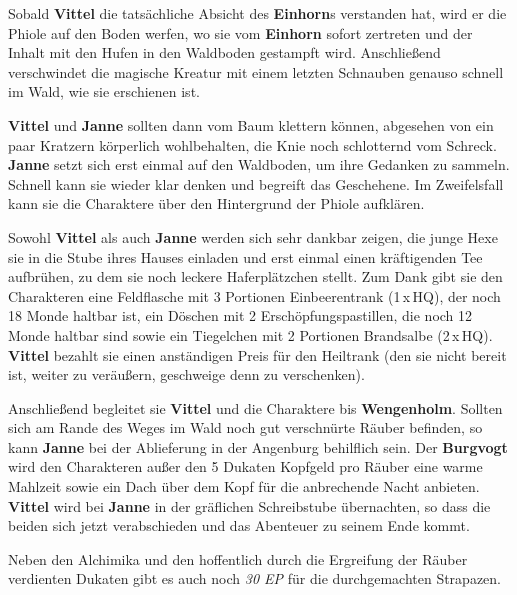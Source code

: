 Sobald \textbf{Vittel} die tatsächliche Absicht des \textbf{Einhorn}s verstanden hat, wird er die Phiole auf den Boden werfen, wo sie vom \textbf{Einhorn} sofort zertreten und der Inhalt mit den Hufen in den Waldboden gestampft wird.
Anschließend verschwindet die magische Kreatur mit einem letzten Schnauben genauso schnell im Wald, wie sie erschienen ist.


\textbf{Vittel} und \textbf{Janne} sollten dann vom Baum klettern können, abgesehen von ein paar Kratzern körperlich wohlbehalten, die Knie noch schlotternd vom Schreck.
\textbf{Janne} setzt sich erst einmal auf den Waldboden, um ihre Gedanken zu sammeln. Schnell kann sie wieder klar denken und begreift das Geschehene. Im Zweifelsfall kann sie die Charaktere über den Hintergrund der Phiole aufklären.

Sowohl \textbf{Vittel} als auch \textbf{Janne} werden sich sehr dankbar zeigen, die junge Hexe sie in die Stube ihres Hauses einladen und erst einmal einen kräftigenden Tee aufbrühen, zu dem sie noch leckere Haferplätzchen stellt.
Zum Dank gibt sie den Charakteren eine Feldflasche mit 3 Portionen Einbeerentrank (1\,x\,HQ), der noch 18 Monde haltbar ist, ein Döschen mit 2 Erschöpfungspastillen, die noch 12 Monde haltbar sind sowie ein Tiegelchen mit 2 Portionen Brandsalbe (2\,x\,HQ).
\textbf{Vittel} bezahlt sie einen anständigen Preis für den Heiltrank (den sie nicht bereit ist, weiter zu veräußern, geschweige denn zu verschenken).


Anschließend begleitet sie \textbf{Vittel} und die Charaktere bis \textbf{Wengenholm}.
Sollten sich am Rande des Weges im Wald noch gut verschnürte Räuber befinden, so kann \textbf{Janne} bei der Ablieferung in der Angenburg behilflich sein.
Der \textbf{Burgvogt} wird den Charakteren außer den 5 Dukaten Kopfgeld pro Räuber eine warme Mahlzeit sowie ein Dach über dem Kopf für die anbrechende Nacht anbieten.
\textbf{Vittel} wird bei \textbf{Janne} in der gräflichen Schreibstube übernachten, so dass die beiden sich jetzt verabschieden und das Abenteuer zu seinem Ende kommt. 

Neben den Alchimika und den hoffentlich durch die Ergreifung der Räuber verdienten Dukaten gibt es auch noch \textit{30 EP} für die durchgemachten Strapazen.

\spaltenende

\platz

\spaltenanfang

 



